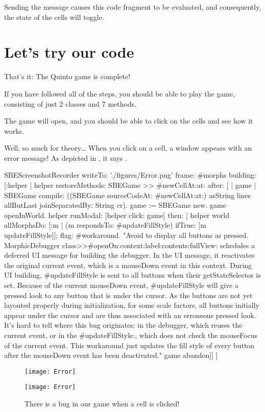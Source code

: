 \documentclass[a4paper,10pt,twoside]{book}
\begin{document}

\noindent
Sending the  message causes this code fragment to be evaluated, and consequently, the state of the cells will toggle.

\section{Let's try our code}

That's it:
The Quinto game is complete!

If you have followed all of the steps, you should be able to play the game, consisting of just 2 classes and 7 methods.


The game will open, and you should be able to click on the cells and see how it works.

Well, so much for theory\ldots{}
When you click on a cell, a  window appears with an error message!
As depicted in , it says .

\begin{ExecuteSmalltalkScript}
SBEScreenshotRecorder writeTo: './figures/Error.png' frame: #morphs building: [:helper |
	helper restoreMethods: {SBEGame >> #newCellAt:at:} after: [
		| game |
		SBEGame compile: ((SBEGame sourceCodeAt: #newCellAt:at:) asString
			lines allButLast joinSeparatedBy: String cr).
		game := SBEGame new.
		game openInWorld.
		helper
			runModal: [helper click: game]
			then: [
				helper world
					allMorphsDo: [:m | (m respondsTo: #updateFillStyle) ifTrue: [m updateFillStyle]];
					flag: #workaround. "Avoid to display all buttons as pressed.
						MorphicDebugger class>>#openOn:context:label:contents:fullView: schedules a deferred UI message for building the debugger. In the UI message, it reactivates the original current event, which is a mouseDown event in this context. During UI building, #updateFillStyle is sent to all buttons when their getStateSelector is set. Because of the current mouseDown event, #updateFillStyle will give a pressed look to any button that is under the cursor. As the buttons are not yet layouted properly during initialization, for some scale factors, all buttons initially appear under the cursor and are thus associated with an erroneous pressed look. It's hard to tell where this bug originates: in the debugger, which reuses the current event, or in the #updateFillStyle:, which does not check the mouseFocus of the current event. This workaround just updates the fill style of every button after the mouseDown event has been deactivated."
				game abandon]]
]
\end{ExecuteSmalltalkScript}
\begin{figure}[ht]
\ifluluelse
	{\centerline{\texttt{[image: Error]}}}
	{\centerline{\texttt{[image: Error]}}}
\caption{There is a bug in our game when a cell is clicked!
\label{fig:quintoError}}
\end{figure}
\end{document}
